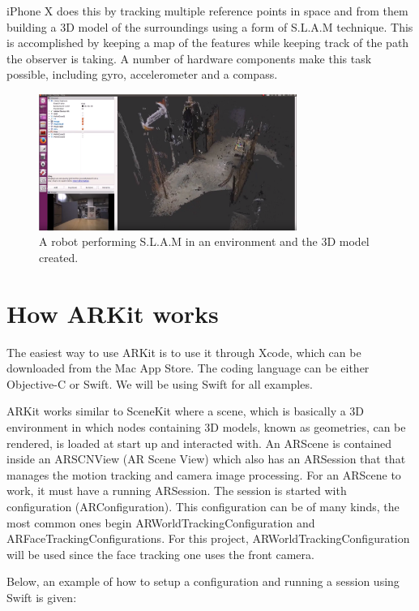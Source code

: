 iPhone X does this by tracking multiple reference points in space and from them building a 3D model of the surroundings using a form of S.L.A.M technique.
This is accomplished by keeping a map of the features while keeping track of the path the observer is taking. A number of 
hardware components make this task possible, including gyro, accelerometer and a compass. \cite{iphoneslam}

\begin{figure}[hbtp]
\begin{center}
\includegraphics[width = 0.75\textwidth]{./Images/slam-map.jpg} 
\caption{A robot performing S.L.A.M in an environment and the 3D model created.}
\label{fig:slam}
\end{center}
\end{figure}

\section{How ARKit works}
\label{subsecARKit}
The easiest way to use ARKit is to use it through Xcode, which can be downloaded from the Mac App Store.
The coding language can be either Objective-C or Swift. We will be using Swift for all
examples.

ARKit works similar to SceneKit where a scene, which is basically a 3D environment in which nodes containing 3D models, known as geometries, can be rendered, is loaded at start up and interacted with.
An ARScene is contained inside an ARSCNView (AR Scene View) which also has an ARSession
that that manages the motion tracking and camera image processing. For an ARScene to work, it must have a running ARSession.
The session is started with configuration (ARConfiguration). This configuration can be of many kinds, the most common ones begin ARWorldTrackingConfiguration and ARFaceTrackingConfigurations. For this project, ARWorldTrackingConfiguration will be used since the face tracking one uses the front camera.

Below, an example of how to setup a configuration and running a session using Swift is given:


